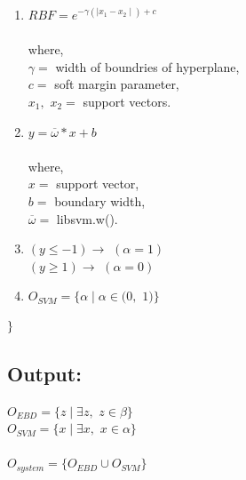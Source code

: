 \documentclass[12pt,a4paper,final]{report}
\DeclareRobustCommand{\gobblefive}[5]{}
\newcommand*{\SkipTocEntry}{\addtocontents{toc}{\gobblefive}}
\begin{document}
\begin{enumerate}

\item $RBF = e^{-\gamma(\mid x_{1}-x_{2} \mid)+c}$\\ \\where, \\ $\gamma =$ width of boundries of hyperplane, \\ $c =$ soft margin parameter, \\ $x_{1}, $ $x_{2} =$ support vectors.


\item $y = \overline{\omega} * x + b$\\ \\where, \\ $x =$ support vector, \\ $b =$ boundary width, \\ $\overline{\omega} =$ libsvm.w().

\item $(y \leq -1) \rightarrow  $ $ (\alpha = 1)$ \\ $(y \geq 1) \rightarrow  $ $ (\alpha = 0)$

\item $ O_{SVM} = \lbrace \alpha \mid \alpha \in (0, $ $1) \rbrace$

\end{enumerate}

$\\ \rbrace$

\SkipTocEntry\subsection{Output:}

$O_{EBD} = \lbrace z \mid \exists z, $ $ z \in \beta \rbrace$ \\
$O_{SVM} = \lbrace x \mid \exists x, $ $ x \in \alpha \rbrace$ \\
\\
$O_{system} = \lbrace O_{EBD} \cup O_{SVM} \rbrace$
\end{document}

